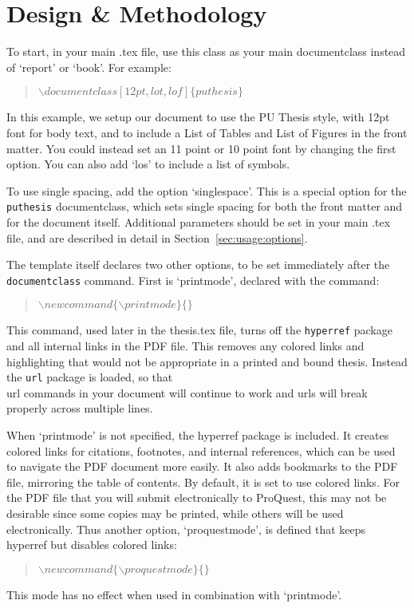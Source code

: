 
\chapter{Design \& Methodology\label{ch:usage}}

To start, in your main .tex file, use this class as your main documentclass instead of `report' or `book'. For example:
\begin{quote}
$\backslash documentclass[12pt,lot, lof]\{puthesis\}$
\end{quote}

In this example, we setup our document to use the PU Thesis style, with 12pt font for body text, and to include a List of Tables and List of Figures in the front matter. You could instead set an 11 point or 10 point font by changing the first option. You can also add `los' to include a list of symbols.

To use single spacing, add the option `singlespace'. This is a special option for the \texttt{puthesis} documentclass, which sets single spacing for both the front matter and for the document itself. Additional parameters should be set in your main .tex file, and are described in detail in Section~\ref{sec:usage:options}.

The template itself declares two other options, to be set immediately after the \texttt{documentclass} command. First is `printmode', declared with the command:
\begin{quote}
$\backslash newcommand\{\backslash printmode\}\{\}$
\end{quote}
This command, used later in the thesis.tex file, turns off the \texttt{hyperref} package and all internal links in the PDF file. This removes any colored links and highlighting that would not be appropriate in a printed and bound thesis. Instead the \texttt{url} package is loaded, so that \\url commands in your document will continue to work and urls will break properly across multiple lines.

When `printmode' is not specified, the hyperref package is included. It creates colored links for citations, footnotes, and internal references, which can be used to navigate the PDF document more easily. It also adds bookmarks to the PDF file, mirroring the table of contents. By default, it is set to use colored links. For the PDF file that you will submit electronically to ProQuest, this may not be desirable since some copies may be printed, while others will be used electronically. Thus another option, `proquestmode', is defined that keeps hyperref but disables colored links:
\begin{quote}
$\backslash newcommand\{\backslash proquestmode\}\{\}$
\end{quote}
This mode has no effect when used in combination with `printmode'.




